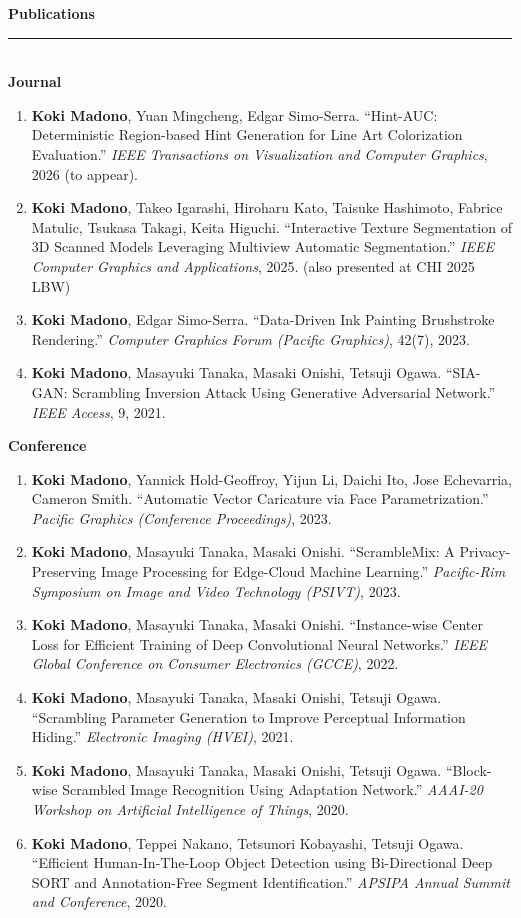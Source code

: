 \documentclass[10pt,a4paper]{article}
\newcommand{\cvsection}[1]{%
  \vspace{9pt}%
  {\large\bfseries\color{accent}#1}\\[-9pt]
  {\color{lightblue}\rule{\textwidth}{0.9pt}}\\[2pt]%
}
\begin{document}
\cvsection{Publications}
\textbf{Journal}
\begin{enumerate}[leftmargin=16pt,itemsep=2pt,parsep=0pt,topsep=2pt]
  \item \textbf{Koki Madono}, Yuan Mingcheng, Edgar Simo-Serra.
        ``Hint-AUC: Deterministic Region-based Hint Generation for Line Art Colorization Evaluation.''
        \textit{IEEE Transactions on Visualization and Computer Graphics}, 2026 (to appear).
  \item \textbf{Koki Madono}, Takeo Igarashi, Hiroharu Kato, Taisuke Hashimoto, Fabrice Matulic, Tsukasa Takagi, Keita Higuchi.
        ``Interactive Texture Segmentation of 3D Scanned Models Leveraging Multiview Automatic Segmentation.''
        \textit{IEEE Computer Graphics and Applications}, 2025. (also presented at CHI 2025 LBW)
  \item \textbf{Koki Madono}, Edgar Simo-Serra.
        ``Data-Driven Ink Painting Brushstroke Rendering.''
        \textit{Computer Graphics Forum (Pacific Graphics)}, 42(7), 2023.
  \item \textbf{Koki Madono}, Masayuki Tanaka, Masaki Onishi, Tetsuji Ogawa.
        ``SIA-GAN: Scrambling Inversion Attack Using Generative Adversarial Network.''
        \textit{IEEE Access}, 9, 2021.
\end{enumerate}
\textbf{Conference}
\begin{enumerate}[leftmargin=16pt,itemsep=2pt,parsep=0pt,topsep=2pt,start=5]
  \item \textbf{Koki Madono}, Yannick Hold-Geoffroy, Yijun Li, Daichi Ito, Jose Echevarria, Cameron Smith.
        ``Automatic Vector Caricature via Face Parametrization.''
        \textit{Pacific Graphics (Conference Proceedings)}, 2023.
  \item \textbf{Koki Madono}, Masayuki Tanaka, Masaki Onishi.
        ``ScrambleMix: A Privacy-Preserving Image Processing for Edge-Cloud Machine Learning.''
        \textit{Pacific-Rim Symposium on Image and Video Technology (PSIVT)}, 2023.
  \item \textbf{Koki Madono}, Masayuki Tanaka, Masaki Onishi.
        ``Instance-wise Center Loss for Efficient Training of Deep Convolutional Neural Networks.''
        \textit{IEEE Global Conference on Consumer Electronics (GCCE)}, 2022.
  \item \textbf{Koki Madono}, Masayuki Tanaka, Masaki Onishi, Tetsuji Ogawa.
        ``Scrambling Parameter Generation to Improve Perceptual Information Hiding.''
        \textit{Electronic Imaging (HVEI)}, 2021.
  \item \textbf{Koki Madono}, Masayuki Tanaka, Masaki Onishi, Tetsuji Ogawa.
        ``Block-wise Scrambled Image Recognition Using Adaptation Network.''
        \textit{AAAI-20 Workshop on Artificial Intelligence of Things}, 2020.
  \item \textbf{Koki Madono}, Teppei Nakano, Tetsunori Kobayashi, Tetsuji Ogawa.
        ``Efficient Human-In-The-Loop Object Detection using Bi-Directional Deep SORT and Annotation-Free Segment Identification.''
        \textit{APSIPA Annual Summit and Conference}, 2020.
\end{enumerate}
\end{document}
